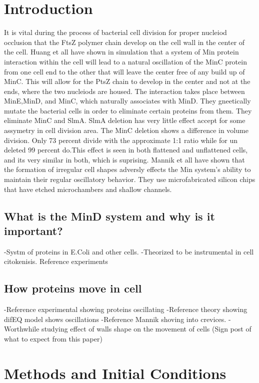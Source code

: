 \documentclass[letterpaper,twocolumn,amsmath,amssymb,pre]{revtex4-1}
\begin{document}
\section{Introduction}
It is vital during the process of bacterial cell division for proper nucleiod occlusion that the FtsZ polymer chain develop on the cell wall in the center of the cell.  Huang et all have shown in simulation that a system of Min protein interaction within the cell will lead to a natural oscillation of the MinC protein from one cell end to the other that will leave the center free of any build up of MinC.  This will allow for the PtsZ chain to develop in the center and not at the ends, where the two nucleiods are housed.  The interaction takes place between MinE,MinD, and MinC, which naturally associates with MinD.
They gneetically mutate the bacterial cells in order to eliminate certain proteins from them.  They eliminate MinC and SlmA.  SlmA deletion has very little effect accept for some assymetry in cell division area.  The MinC deletion shows a difference in volume division.  Only 73 percent divide with the approximate 1:1 ratio while for un deleted 99 percent do.This effect is seen in both flattened and unflattened cells, and its very similar in both, which is suprising.
Mannik et all have shown that the formation of irregular cell shapes adversly effects the Min system's ability to maintain their regular oscillatory behavior.  They use microfabricated silicon chips that have etched microchambers and shallow channels.

\subsection{What is the MinD system and why is it important?}


-Systm of proteins in E.Coli and other cells.
-Theorized to be instrumental in cell citokenisis. Reference experiments
\subsection{How proteins move in cell}
-Reference experimental showing proteins oscillating
-Reference theory showing difEQ model shows oscillations
-Reference Mannik shoving into crevices.
-Worthwhile studying effect of walls shape on the movement of cells
(Sign post of what to expect from this paper)

\section{Methods and Initial Conditions}
\end{document}
